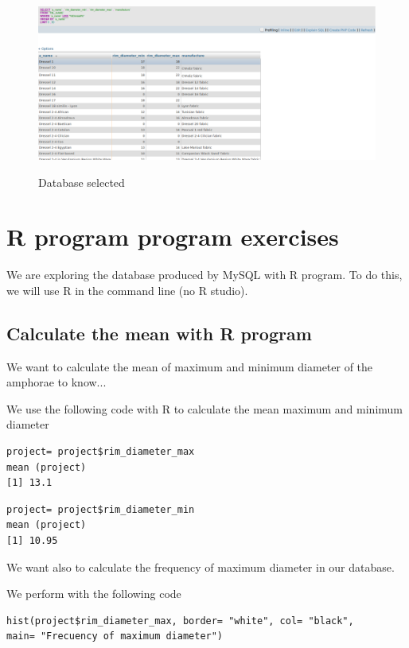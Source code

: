 \documentclass[10pt,a4paper]{article}
\begin{document}
\begin{figure}[hdp]
\centering
\includegraphics[scale=0.30]{query5.png}
\label{query5}
\caption{Database selected}
\end{figure} 

\section{R program program exercises}

We are exploring the database produced by MySQL with R program. To do this, we will use R in the command line (no R studio).

\subsection{Calculate the mean with R program}

We want to calculate the mean of maximum and minimum diameter of the amphorae to know...

We use the following code with R to calculate the mean maximum and minimum diameter

\begin{verbatim}
project= project$rim_diameter_max
mean (project)
[1] 13.1
\end{verbatim}

\begin{verbatim}
project= project$rim_diameter_min
mean (project)
[1] 10.95
\end{verbatim}

We want also to calculate the frequency of maximum diameter in our database.

We perform with the following code

\begin{verbatim}
hist(project$rim_diameter_max, border= "white", col= "black", 
main= "Frecuency of maximum diameter")
\end{verbatim}
\end{document}
